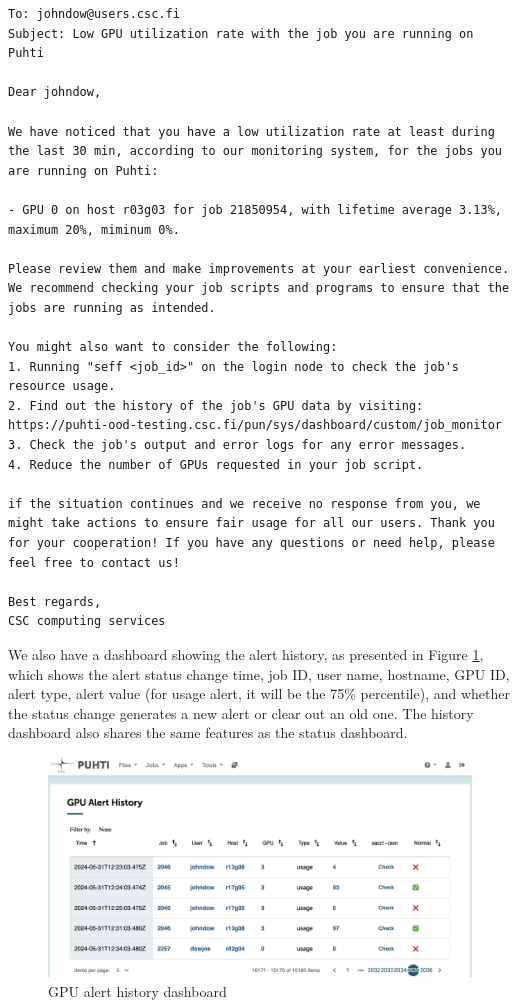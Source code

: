 \begin{verbatim}
To: johndow@users.csc.fi
Subject: Low GPU utilization rate with the job you are running on Puhti

Dear johndow,

We have noticed that you have a low utilization rate at least during the last 30 min, according to our monitoring system, for the jobs you are running on Puhti:

- GPU 0 on host r03g03 for job 21850954, with lifetime average 3.13%, maximum 20%, miminum 0%.

Please review them and make improvements at your earliest convenience. We recommend checking your job scripts and programs to ensure that the jobs are running as intended.

You might also want to consider the following:
1. Running "seff <job_id>" on the login node to check the job's resource usage.
2. Find out the history of the job's GPU data by visiting: https://puhti-ood-testing.csc.fi/pun/sys/dashboard/custom/job_monitor
3. Check the job's output and error logs for any error messages.
4. Reduce the number of GPUs requested in your job script.

if the situation continues and we receive no response from you, we might take actions to ensure fair usage for all our users. Thank you for your cooperation! If you have any questions or need help, please feel free to contact us!

Best regards,
CSC computing services
\end{verbatim}

\clearpage

We also have a dashboard showing the alert history, as presented in Figure \ref{fig_history_dashboard}, which shows the alert status change time, job ID, user name, hostname, GPU ID, alert type, alert value (for usage alert, it will be the 75\% percentile), and whether the status change generates a new alert or clear out an old one. The history dashboard also shares the same features as the status dashboard.

\begin{figure}[H]
    \centering
    \includegraphics[width=1.1\textwidth]{figures/history-dashboard.png}
    \caption{GPU alert history dashboard}
    \label{fig_history_dashboard}
\end{figure}
